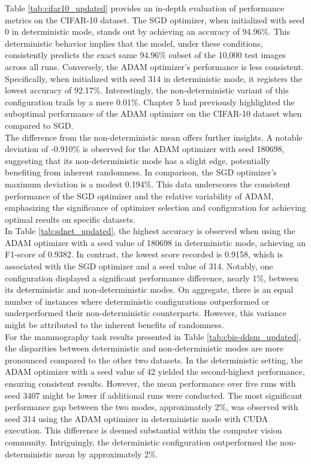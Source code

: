 Table \ref{tab:cifar10_updated} provides an in-depth evaluation of performance metrics on the CIFAR-10 dataset. The SGD optimizer, when initialized with seed 0 in deterministic mode, stands out by achieving an accuracy of 94.96\%. This deterministic behavior implies that the model, under these conditions, consistently predicts the exact same 94.96\% subset of the 10,000 test images across all runs. Conversely, the ADAM optimizer's performance is less consistent. Specifically, when initialized with seed 314 in deterministic mode, it registers the lowest accuracy of 92.17\%. Interestingly, the non-deterministic variant of this configuration trails by a mere 0.01\%. Chapter 5 had previously highlighted the suboptimal performance of the ADAM optimizer on the CIFAR-10 dataset when compared to SGD.\\

The difference from the non-deterministic mean offers further insights. A notable deviation of -0.910\% is observed for the ADAM optimizer with seed 180698, suggesting that its non-deterministic mode has a slight edge, potentially benefiting from inherent randomness. In comparison, the SGD optimizer's maximum deviation is a modest 0.194\%. This data underscores the consistent performance of the SGD optimizer and the relative variability of ADAM, emphasizing the significance of optimizer selection and configuration for achieving optimal results on specific datasets.\\

In Table \ref{tab:sdnet_updated}, the highest accuracy is observed when using the ADAM optimizer with a seed value of 180698 in deterministic mode, achieving an F1-score of 0.9382. In contrast, the lowest score recorded is 0.9158, which is associated with the SGD optimizer and a seed value of 314. Notably, one configuration displayed a significant performance difference, nearly 1\%, between its deterministic and non-deterministic modes. On aggregate, there is an equal number of instances where deterministic configurations outperformed or underperformed their non-deterministic counterparts. However, this variance might be attributed to the inherent benefits of randomness.\\

For the mammography task results presented in Table \ref{tab:cbis-ddsm_updated}, the disparities between deterministic and non-deterministic modes are more pronounced compared to the other two datasets. In the deterministic setting, the ADAM optimizer with a seed value of 42 yielded the second-highest performance, ensuring consistent results. However, the mean performance over five runs with seed 3407 might be lower if additional runs were conducted. The most significant performance gap between the two modes, approximately 2\%, was observed with seed 314 using the ADAM optimizer in deterministic mode with CUDA execution. This difference is deemed substantial within the computer vision community. Intriguingly, the deterministic configuration outperformed the non-deterministic mean by approximately 2\%.\\

